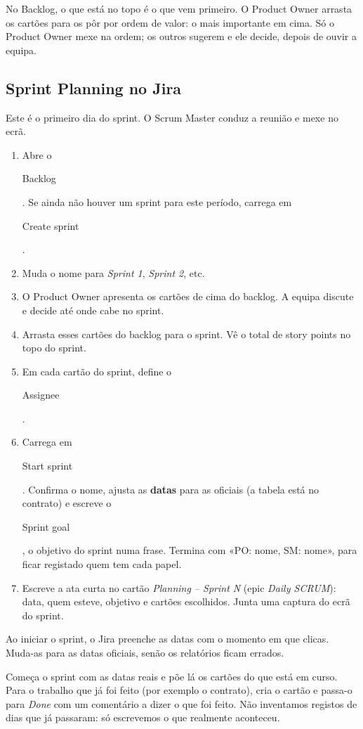 \documentclass[11pt,a4paper]{article}
\newcommand{\btn}[1]{{\setlength{\fboxsep}{1.6pt}\colorbox{azulclaro}{\sffamily\small\strut #1}}}
\begin{document}
No Backlog, o que está no topo é o que vem primeiro. O Product Owner arrasta os cartões para os pôr por ordem de valor: o mais importante em cima. Só o Product Owner mexe na ordem; os outros sugerem e ele decide, depois de ouvir a equipa.

\subsection{Sprint Planning no Jira}

Este é o primeiro dia do sprint. O Scrum Master conduz a reunião e mexe no ecrã.

\begin{enumerate}
  \item Abre o \btn{Backlog}. Se ainda não houver um sprint para este período, carrega em \btn{Create sprint}.
  \item Muda o nome para \textit{Sprint 1}, \textit{Sprint 2}, etc.
  \item O Product Owner apresenta os cartões de cima do backlog. A equipa discute e decide até onde cabe no sprint.
  \item Arrasta esses cartões do backlog para o sprint. Vê o total de story points no topo do sprint.
  \item Em cada cartão do sprint, define o \btn{Assignee}.
  \item Carrega em \btn{Start sprint}. Confirma o nome, ajusta as \textbf{datas} para as oficiais (a tabela está no contrato) e escreve o \btn{Sprint goal}, o objetivo do sprint numa frase. Termina com «PO: nome, SM: nome», para ficar registado quem tem cada papel.
  \item Escreve a ata curta no cartão \textit{Planning – Sprint N} (epic \textit{Daily SCRUM}): data, quem esteve, objetivo e cartões escolhidos. Junta uma captura do ecrã do sprint.
\end{enumerate}

\begin{tcolorbox}[atencao, title={Atenção: as datas}]
  Ao iniciar o sprint, o Jira preenche as datas com o momento em que clicas. Muda-as para as datas oficiais, senão os relatórios ficam errados.
\end{tcolorbox}

\begin{tcolorbox}[dica, title={E se já estamos a meio do sprint?}]
  Começa o sprint com as datas reais e põe lá os cartões do que está em curso. Para o trabalho que já foi feito (por exemplo o contrato), cria o cartão e passa-o para \textit{Done} com um comentário a dizer o que foi feito. Não inventamos registos de dias que já passaram: só escrevemos o que realmente aconteceu.
\end{tcolorbox}
\end{document}
